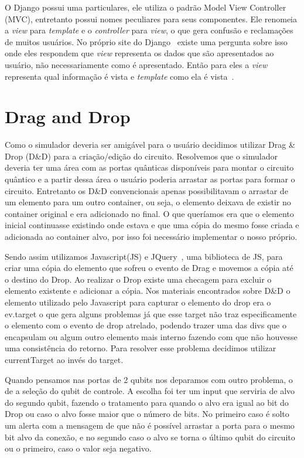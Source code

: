 \documentclass[a4paper, 12pt, oneside]{book}
\begin{document}
O Django possui uma particulares, ele utiliza o padrão Model View Controller (MVC), entretanto possui nomes peculiares para seus componentes. Ele renomeia a \textit{view} para \textit{template} e o \textit{controller} para \textit{view}, o que gera confusão e reclamações de muitos usuários. No próprio site do Django~\cite{django} existe uma pergunta sobre isso onde eles respondem que \textit{view} representa os dados que são apresentados ao usuário, não necessariamente como é apresentado. Então para eles a \textit{view} representa qual informação é vista e \textit{template} como ela é vista~\cite{django-mvc}.

\section{Drag and Drop} \label{sec:dragdrop}

Como o simulador deveria ser amigável para o usuário decidimos utilizar Drag \& Drop (D\&{D}) para a criação/edição do circuito. Resolvemos que o simulador deveria ter uma área com as portas quânticas disponíveis para montar o circuito quântico e a partir dessa área o usuário poderia arrastar as portas para formar o circuito. Entretanto os D\&{D} convencionais apenas possibilitavam o arrastar de um elemento para um outro container, ou seja, o elemento deixava de existir no container original e era adicionado no final. O que queríamos era que o elemento inicial continuasse existindo onde estava e que uma cópia do mesmo fosse criada e adicionada ao container alvo, por isso foi necessário implementar o nosso próprio.

Sendo assim utilizamos Javascript(JS) e JQuery~\cite{jquery}, uma biblioteca de JS, para criar uma cópia do elemento que sofreu o evento de Drag e movemos a cópia até o destino do Drop. Ao realizar o Drop existe uma checagem para excluir o elemento existente e adicionar a cópia. Nos materiais encontrados sobre D\&{D} o elemento utilizado pelo Javascript para capturar o elemento do drop era o ev.target o que gera alguns problemas já que esse target não traz especificamente o elemento com o evento de drop atrelado, podendo trazer uma das divs que o encapsulam ou algum outro elemento mais interno fazendo com que não houvesse uma consistência do retorno. Para resolver esse problema decidimos utilizar currentTarget ao invés do target.

Quando pensamos nas portas de 2 qubits nos deparamos com outro problema, o de a seleção do qubit de controle. A escolha foi ter um input que serviria de alvo do segundo qubit, fazendo o tratamento para quando o alvo era igual ao bit do Drop ou caso o alvo fosse maior que o número de bits. No primeiro caso é solto um alerta com a mensagem de que não é possível arrastar a porta para o mesmo bit alvo da conexão, e no segundo caso o alvo se torna o último qubit do circuito ou o primeiro, caso o valor seja negativo.
\end{document}
